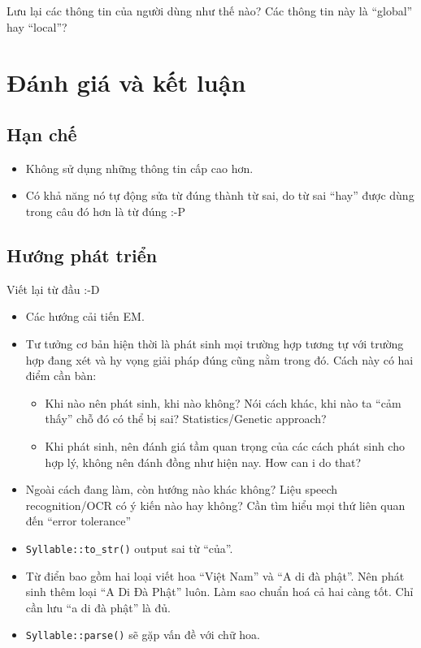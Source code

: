 \documentclass[a4paper,oneside,14pt]{extbook} %
\begin{document}
Lưu lại các thông tin của người dùng như thế nào? Các thông tin này là
``global'' hay ``local''?





\chapter{Đánh giá và kết luận}
\label{cha:conclusion}
\minitoc

\section{Hạn chế}
\begin{itemize}
\item Không sử dụng những thông tin cấp cao hơn.
\item Có khả năng nó tự động sửa từ đúng thành từ sai, do từ sai
  ``hay'' được dùng trong câu đó hơn là từ đúng :-P
\end{itemize}

\section{Hướng phát triển}
\label{sec:todo}

Viết lại từ đầu :-D

\begin{itemize}
\item Các hướng cải tiến EM.
\item Tư tưởng cơ bản hiện thời là phát sinh mọi trường hợp tương tự
  với trường hợp đang xét và hy vọng giải pháp đúng cũng nằm trong
  đó. Cách này có hai điểm cần bàn:
  \begin{itemize}
  \item Khi nào nên phát sinh, khi nào không? Nói cách khác, khi nào
    ta ``cảm thấy'' chỗ đó có thể bị sai? Statistics/Genetic approach?
  \item Khi phát sinh, nên đánh giá tầm quan trọng của các cách phát
    sinh  cho hợp lý, không nên đánh đồng như hiện nay. How can i do
    that? 
  \end{itemize}
\item Ngoài cách đang làm, còn hướng nào khác không? Liệu speech
  recognition/OCR có ý kiến nào hay không? Cần tìm hiểu mọi thứ liên
  quan đến ``error tolerance''
\item \verb#Syllable::to_str()# output sai từ ``của''.
\item Từ điển bao gồm hai loại viết hoa ``Việt Nam'' và ``A di đà
  phật''. Nên phát sinh thêm loại ``A Di Đà Phật'' luôn. Làm sao chuẩn
  hoá cả hai càng tốt. Chỉ cần lưu ``a di đà phật'' là đủ.
\item \verb#Syllable::parse()# sẽ gặp vấn đề với chữ hoa.
\end{itemize}
\end{document}
